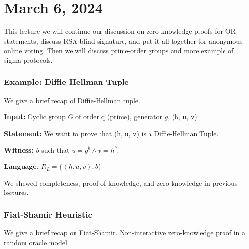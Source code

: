 \section{March 6, 2024}
\label{20240306}

This lecture we will continue our discussion on zero-knowledge proofs for OR statements, discuss RSA blind signature, and put it all together for anonymous online voting. Then we will discuss prime-order groups and more example of sigma protocols.

\subsubsection{Example: Diffie-Hellman Tuple}

We give a brief recap of Diffie-Hellman tuple.

\textbf{Input:} Cyclic group $G$ of order q (prime), generator $g$, (h, u, v)

\textbf{Statement:} We want to prove that (h, u, v) is a Diffie-Hellman Tuple.

\textbf{Witness:} $b$ such that $u = g^b \wedge v = h^b$.

\textbf{Language:} $R_L = \{ (h, u, v), b\}$


We showed completeness, proof of knowledge, and zero-knowledge in previous lectures.

\subsubsection{Fiat-Shamir Heuristic}

We give a brief recap on Fiat-Shamir. Non-interactive zero-knowledge proof in a random oracle model. 


